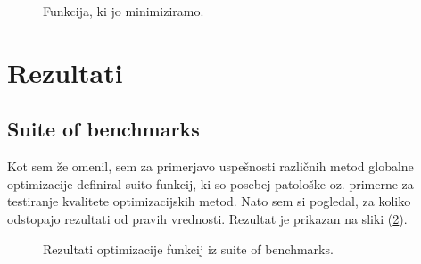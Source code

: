 \documentclass[a4paper]{article}
\begin{document}
\begin{figure}[H]
    \centering
    \caption{Funkcija, ki jo minimiziramo.}
    \label{fig:semafor}
\end{figure}

\section{Rezultati}
\subsection{Suite of benchmarks}
Kot sem že omenil, sem za primerjavo uspešnosti različnih metod globalne optimizacije definiral suito funkcij, ki so
posebej patološke oz. primerne za testiranje kvalitete optimizacijskih metod. Nato sem si pogledal, za koliko odstopajo
rezultati od pravih vrednosti. Rezultat je prikazan na sliki (\ref{fig:benchmarks_results}). \\

\begin{figure}[H]
    \centering
    \caption{Rezultati optimizacije funkcij iz suite of benchmarks.}
    \label{fig:benchmarks_results}
\end{figure}
\end{document}
